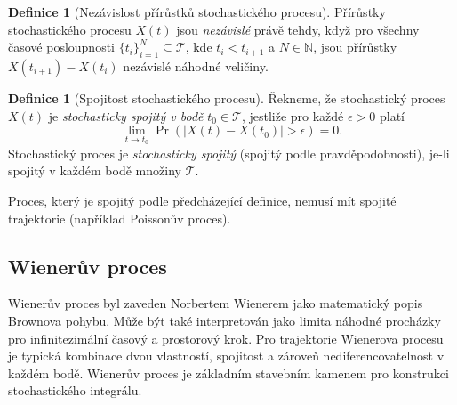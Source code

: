 \documentclass[a4paper,12pt]{report}
\theoremstyle{definition} \newtheorem{definice}[veta]{Definice}
\theoremstyle{remark}
\begin{document}
\begin{definice}[Nezávislost přírůstků stochastického procesu]
Přírůstky stochastického procesu $X(t)$ jsou \textit{nezávislé} právě tehdy, když pro všechny časové posloupnosti $\{t_i\}_{i=1}^N\subseteq\mathcal{T}$, kde $t_i<t_{i+1}$ a $N\in\mathbb{N}$, jsou přírůstky $X(t_{i+1})-X(t_i)$ nezávislé náhodné veličiny.
\end{definice}

\begin{definice}[Spojitost stochastického procesu]
Řekneme, že stochastický proces $X(t)$ je \textit{stochasticky spojitý v bodě} $t_0\in\mathcal{T}$, jestliže pro každé $\epsilon>0$ platí
$$\lim_{t\to t_0}\Pr(|X(t)-X(t_0)|>\epsilon)=0.$$
Stochastický proces je  \textit{stochasticky spojitý} (spojitý podle pravděpodobnosti), je-li spojitý v každém bodě množiny $\mathcal{T}$.
\end{definice}
Proces, který je spojitý podle předcházející definice, nemusí mít spojité trajektorie (například Poissonův proces).


\subsection{Wienerův proces}\label{WP_kap}
Wienerův proces byl zaveden Norbertem Wienerem jako matematický popis Brownova pohybu.
Může být také interpretován jako limita náhodné procházky pro infinitezimální časový a prostorový krok.
Pro trajektorie Wienerova procesu je typická kombinace dvou vlastností, spojitost a zároveň nediferencovatelnost v každém bodě.
Wienerův proces je základním stavebním kamenem pro konstrukci stochastického integrálu.
\end{document}

